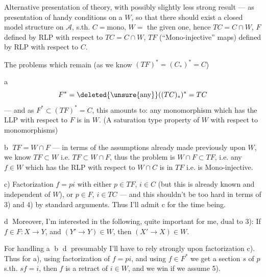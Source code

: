 
Alternative presentation of theory, with possibly slightly less strong result --- as presentation of handy  conditions on a $W$, so that there should exist a closed model structure on $\mathcal A$, s.th. $C=\text{mono}$, $W=$ the given one, hence $TC=C\cap W$, $F$ defined by  RLP with respect to $TC=C\cap W$,  $TF$ (``Mono-injective'' maps) defined by RLP with respect to $C$.

The problems which remain (as we know  $(TF)^*=(C_*)^*=C$)

\textcircled{a}
\[
F^*=\deleted{\unsure{\text{any}}}((TC)_*)^*=TC
\]
--- and as  $F^*\subset(TF)^*=C$, this amounts to: any monomorphism which has the LLP with respect to $F$ is in $W$. (A saturation type property of $W$ with respect to monomorphisms)

\textcircled{b} $TF=W\cap F$ --- in terms of the assumptions already made previously upon $W$, we know $TF\subset W$ i.e. $TF\subset W\cap F$, thus the problem is $W\cap F\subset TF$, i.e. any $f\in W$ which has the RLP with respect to $W\cap C$ is in $TF$ i.e. is Mono-injective.

c) Factorization $f=pi$ with either $p\in TF$, $i\in C$ (but this is already known and independent of $W$), or $p\in F$, $i\in TC$  --- and this shouldn't be too hard in terms of 3) and 4) by standard arguments. Thus I'll admit c for the time being.

\textcircled{d} Moreover, I'm interested in the following, quite important for me, dual to 3): If $f\in F:X\longrightarrow Y$, and $(Y'\longrightarrow Y)\in W$, then $(X'\longrightarrow X)\in W$.

For handling \textcircled{a} \textcircled{b} \textcircled{d} presumably I'll have to rely strongly upon factorization c). Thus for a), using factorization of $f=pi$, and using $f\in F^*$ we get a section $s$ of $p$  s.th. $sf=i$, then $f$ is a retract of $i\in W$, and we win if we assume 5).

